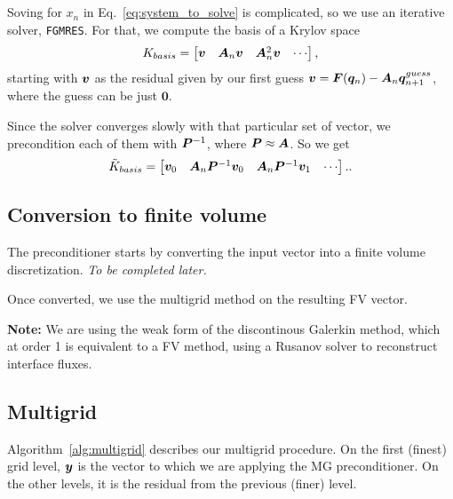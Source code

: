 \documentclass{article}
\begin{document}
\subsection{\fgmres}\label{sec:fgmres}

Soving for $x_n$ in Eq.~\ref{eq:system_to_solve} is complicated, so we use an iterative solver, \texttt{FGMRES}.
For that, we compute the basis of a Krylov space
$$K_{basis} = \left[\begin{matrix} \bm{v} & \bm{A}_n\bm{v} & \bm{A}_n^2 \bm{v} & \cdots \end{matrix}\right],$$
 starting with $\bm{v}$ as the residual given by our first guess
$\bm{v} = \bm{F}(\bm{q}_{n}) - \bm{A}_n \bm{q}_{n+1}^{guess}$, where the guess can be just $\bm{0}$.

Since the solver converges slowly with that particular set of vector, we precondition each of them
with $\bm{P}^{-1}$, where $\bm{P}\approx\bm{A}$.
So we get 
\begin{equation}
\tilde{K}_{basis} = \left[\begin{matrix}
    \bm{v}_0 &
    \bm{A}_n\bm{P}^{-1}\bm{v}_0 &
    \bm{A}_n\bm{P}^{-1}\bm{v}_1 & \cdots \end{matrix}\right].
    \text{.}
\end{equation}


\subsection{Conversion to finite volume}\label{sec:finite_volume}

The \fgmres{} preconditioner starts by converting the input vector into a finite volume discretization. \emph{To be completed later.}

Once converted, we use the multigrid method on the resulting FV vector.

\textbf{Note:} We are using the weak form of the discontinous Galerkin method,
which at order 1 is equivalent to a FV method, using a Rusanov solver to reconstruct interface fluxes.


\subsection{Multigrid}\label{sec:multigrid}

Algorithm~\ref{alg:multigrid} describes our multigrid procedure.
On the first (finest) grid level, $\bm{y}$ is the vector to which we are applying the MG preconditioner.
On the other levels, it is the residual from the previous (finer) level.
\end{document}
